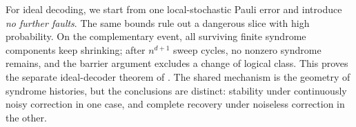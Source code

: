 For ideal decoding, we start from one local-stochastic Pauli error and introduce \emph{no further faults}.  The same bounds rule out a dangerous slice with high probability.  On the complementary event, all surviving finite syndrome components keep shrinking; after $n^{d+1}$ sweep cycles, no nonzero syndrome remains, and the barrier argument excludes a change of logical class.  This proves the separate ideal-decoder theorem of .  The shared mechanism is the geometry of syndrome histories, but the conclusions are distinct: stability under continuously noisy correction in one case, and complete recovery under noiseless correction in the other.
